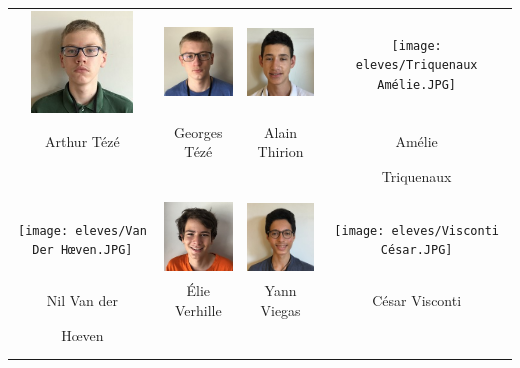 \vfill
\pagebreak

\begin{center}
\begin{tabular}{cccc}
 \includegraphics[angle=270,origin=c, width=27mm]{eleves/Teze Arthur.JPG} &
\includegraphics[angle=270,origin=c, width=27mm]{eleves/Teze Georges.JPG} &
\includegraphics[angle=270,origin=c, width=27mm]{eleves/Thirion Alain.JPG} &
\texttt{[image: eleves/Triquenaux Amélie.JPG]} \\
Arthur Tézé & Georges Tézé & Alain Thirion & Amélie \\ & & & Triquenaux \\ \\ \\ 

\texttt{[image: eleves/Van Der Hœven.JPG]} &
\includegraphics[angle=270,origin=c, width=27mm]{eleves/Verhille Elie.JPG} &
\includegraphics[angle=270,origin=c, width=27mm]{eleves/Viegas Yann.JPG} &
\texttt{[image: eleves/Visconti César.JPG]} \\
Nil Van der & Élie Verhille & Yann Viegas & César Visconti \\  Hœven & & & \\ \\ \\ 


\end{tabular}
\end{center}

